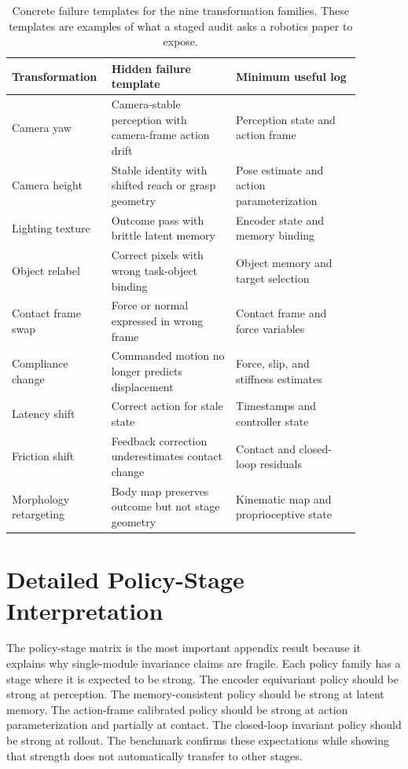 \documentclass{article}
\begin{document}
\begin{table}[t]
\centering
\small
\begin{tabular}{p{0.20\linewidth}p{0.34\linewidth}p{0.34\linewidth}}
\toprule
Transformation & Hidden failure template & Minimum useful log \\
\midrule
Camera yaw & Camera-stable perception with camera-frame action drift & Perception state and action frame \\
Camera height & Stable identity with shifted reach or grasp geometry & Pose estimate and action parameterization \\
Lighting texture & Outcome pass with brittle latent memory & Encoder state and memory binding \\
Object relabel & Correct pixels with wrong task-object binding & Object memory and target selection \\
Contact frame swap & Force or normal expressed in wrong frame & Contact frame and force variables \\
Compliance change & Commanded motion no longer predicts displacement & Force, slip, and stiffness estimates \\
Latency shift & Correct action for stale state & Timestamps and controller state \\
Friction shift & Feedback correction underestimates contact change & Contact and closed-loop residuals \\
Morphology retargeting & Body map preserves outcome but not stage geometry & Kinematic map and proprioceptive state \\
\bottomrule
\end{tabular}
\caption{Concrete failure templates for the nine transformation families. These templates are examples of what a staged audit asks a robotics paper to expose.}
\label{tab:failure-templates}
\end{table}

\section{Detailed Policy-Stage Interpretation}

The policy-stage matrix is the most important appendix result because it explains why single-module invariance claims are fragile. Each policy family has a stage where it is expected to be strong. The encoder equivariant policy should be strong at perception. The memory-consistent policy should be strong at latent memory. The action-frame calibrated policy should be strong at action parameterization and partially at contact. The closed-loop invariant policy should be strong at rollout. The benchmark confirms these expectations while showing that strength does not automatically transfer to other stages.
\end{document}
